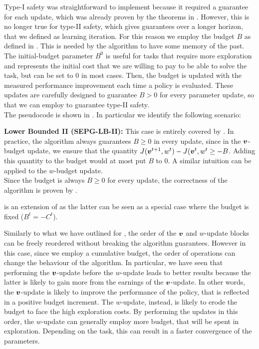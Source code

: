Type-I safety was straightforward to implement because it required a guarantee for each update, which was already proven by the theorems in . However, this is no longer true for type-II safety, which gives guarantees over a longer horizon, that we defined as learning iteration. For this reason we employ the budget $B$ as defined in . This is needed by the algorithm to have some memory of the past. The initial-budget parameter $B^0$ is useful for tasks that require more exploration and represents the initial cost that we are willing to pay to be able to solve the task, but can be set to $0$ in most cases. Then, the budget is updated with the measured performance improvement each time a policy is evaluated. These updates are carefully designed to guarantee $B>0$ for every parameter update, so that we can employ  to guarantee type-II safety.\\
The pseudocode is shown in . In particular we identify the following scenario:

\textbf{Lower Bounded II (SEPG-LB-II):} This case is entirely covered by . In practice, the algorithm always guarantees $B\geq0$ in every update, since in the $\boldsymbol{v}$-budget update, we ensure that the quantity $J(\boldsymbol{v}^{t+1}, w^t) - J(\boldsymbol{v}^t, w^t \geq -B$. Adding this quantity to the budget would at most put $B$ to $0$. A similar intuition can be applied to the $w$-budget update.\\
Since the budget is always $B\geq0$ for every update, the correctness of the algorithm is proven by .

\begin{note}
 is an extension of  as the latter can be seen as a special case where the budget is fixed ($B^t=-C^t$).
\end{note}
\begin{note}
Similarly to what we have outlined for , the order of the $\boldsymbol{v}$ and $w$-update blocks can be freely reordered without breaking the algorithm guarantees. However in this case, since we employ a cumulative budget, the order of operations can change the behaviour of the algorithm.
In particular, we have seen that performing the $\boldsymbol{v}$-update before the $w$-update leads to better results because the latter  is likely to gain more from the earnings of the $\boldsymbol{v}$-update. In other words, the $\boldsymbol{v}$-update is likely to improve the performance of the policy, that is reflected in a positive budget increment. The $w$-update, instead, is likely to erode the budget to face the high exploration costs. By performing the updates in this order, the $w$-update can generally  employ more budget, that will be spent in exploration. Depending on the task, this can result in a faster convergence of the parameters.
\end{note}

